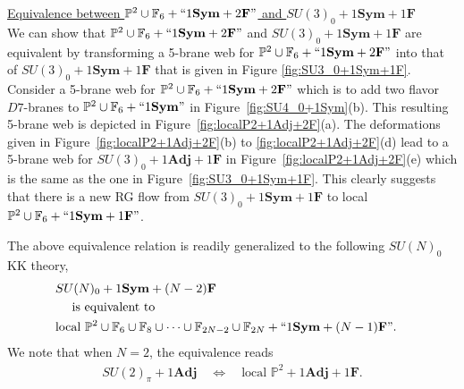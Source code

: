 \noindent\underline{Equivalence between $\mathbb{P}^2\cup \mathbb{F}_6 +``1\mathbf{Sym}+2\mathbf{F}"$ and $SU(3)_{0}+1\mathbf{Sym}+1\mathbf{F}$} \\
We can show that $\mathbb{P}^2\cup \mathbb{F}_6 +``1\mathbf{Sym}+2\mathbf{F}"$ and $SU(3)_{0}+1\mathbf{Sym}+1\mathbf{F}$ are equivalent by transforming a 5-brane web for $\mathbb{P}^2\cup \mathbb{F}_6 +``1\mathbf{Sym}+2\mathbf{F}"$ into that of $SU(3)_{0}+1\mathbf{Sym}+1\mathbf{F}$ that is given in Figure \ref{fig:SU3_0+1Sym+1F}. Consider a 5-brane web for $\mathbb{P}^2\cup \mathbb{F}_6 +``1\mathbf{Sym}+2\mathbf{F}"$ which is to add two flavor $D7$-branes to $\mathbb{P}^2\cup \mathbb{F}_6 +``1\mathbf{Sym}"$ in Figure~\ref{fig:SU4_0+1Sym}(b). This resulting 5-brane web is depicted in Figure~\ref{fig:localP2+1Adj+2F}(a). The deformations given in Figure~\ref{fig:localP2+1Adj+2F}(b) to \ref{fig:localP2+1Adj+2F}(d) lead to a 5-brane web for $SU(3)_0 +1\mathbf{Adj}+1\mathbf{F}$ in Figure~\ref{fig:localP2+1Adj+2F}(e) which is the same as the one in Figure~\ref{fig:SU3_0+1Sym+1F}. This clearly suggests that there is a new RG flow from $SU(3)_0+1\mathbf{Sym}+1\mathbf{F}$ to local $\mathbb{P}^2 \cup \mathbb{F}_6+``1\mathbf{Sym}+1\mathbf{F}"$.

The above equivalence relation is readily generalized to the following $SU(N)_0$ KK theory,
\begin{align}
&SU(N)_0 +1\mathbf{Sym}+(N-2)\mathbf{F} \cr
&~~~~\text{is equivalent to }	\cr
&\text{local }\mathbb{P}^2 \cup \mathbb{F}_6 \cup \mathbb{F}_8 \cup \cdots \cup \mathbb{F}_{2N-2} \cup \mathbb{F}_{2N} +``1\mathbf{Sym}+(N-1)\mathbf{F}".
\end{align}
We note that when $N=2$, the equivalence reads
\begin{align}
	SU(2)_\pi+ 1 \mathbf{Adj}\quad \Longleftrightarrow \quad
	\text{local }\mathbb{P}^2+ 1 \mathbf{Adj} + 1\mathbf{F}.
\end{align}


